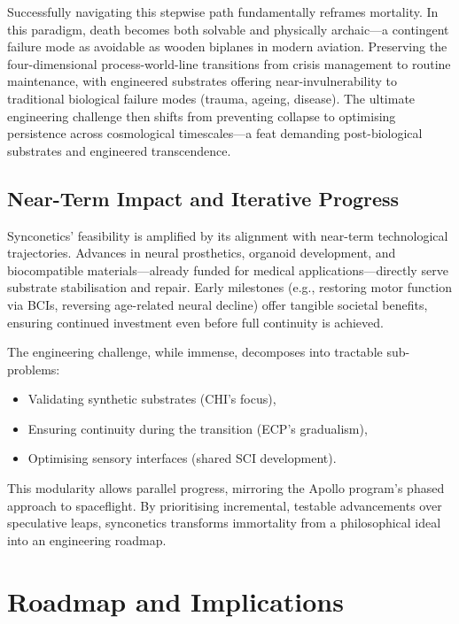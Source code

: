 \documentclass[10pt]{article}
\begin{document}
\begin{sloppypar}
  Successfully navigating this stepwise path fundamentally reframes mortality. In this paradigm, death becomes both solvable and physically archaic—a contingent failure mode as avoidable as wooden biplanes in modern aviation. Preserving the four-dimensional process-world-line transitions from crisis management to routine maintenance, with engineered substrates offering near-invulnerability to traditional biological failure modes (trauma, ageing, disease). The ultimate engineering challenge then shifts from preventing collapse to optimising persistence across cosmological timescales—a feat demanding post-biological substrates and engineered transcendence.

  \subsection{Near-Term Impact and Iterative Progress}

  Synconetics’ feasibility is amplified by its alignment with near-term technological trajectories. Advances in neural prosthetics, organoid development, and biocompatible materials—already funded for medical applications—directly serve substrate stabilisation and repair. Early milestones (e.g., restoring motor function via BCIs, reversing age-related neural decline) offer tangible societal benefits, ensuring continued investment even before full continuity is achieved.

  The engineering challenge, while immense, decomposes into tractable sub-problems:
  \begin{itemize}
    \item Validating synthetic substrates (CHI’s focus),
    \item Ensuring continuity during the transition (ECP’s gradualism),
    \item Optimising sensory interfaces (shared SCI development).
  \end{itemize}

  This modularity allows parallel progress, mirroring the Apollo program’s phased approach to spaceflight. By prioritising incremental, testable advancements over speculative leaps, synconetics transforms immortality from a philosophical ideal into an engineering roadmap.

  \section{Roadmap and Implications}
  \label{sec:roadmap}


\end{sloppypar}
\end{document}
